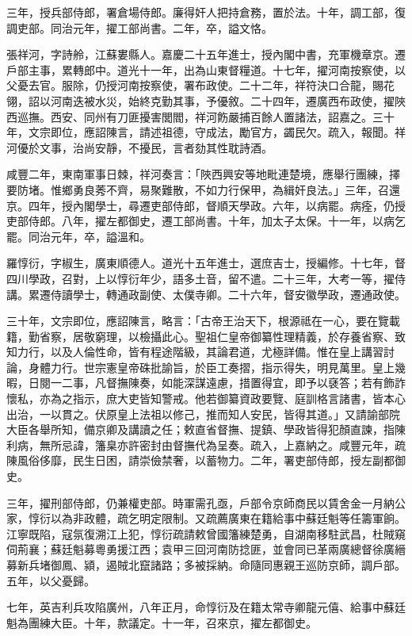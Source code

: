 \begin{pinyinscope}
三年，授兵部侍郎，署倉場侍郎。廉得奸人把持倉務，置於法。十年，調工部，復調吏部。同治元年，擢工部尚書。二年，卒，謚文恪。

張祥河，字詩舲，江蘇婁縣人。嘉慶二十五年進士，授內閣中書，充軍機章京。遷戶部主事，累轉郎中。道光十一年，出為山東督糧道。十七年，擢河南按察使，以父憂去官。服除，仍授河南按察使，署布政使。二十二年，祥符決口合龍，賜花翎，詔以河南迭被水災，始終克勤其事，予優敘。二十四年，遷廣西布政使，擢陜西巡撫。西安、同州有刀匪擾害閭閻，祥河飭嚴捕百餘人置諸法，詔嘉之。三十年，文宗即位，應詔陳言，請述祖德，守成法，勵官方，蠲民欠。疏入，報聞。祥河優於文事，治尚安靜，不擾民，言者劾其性耽詩酒。

咸豐二年，東南軍事日棘，祥河奏言：「陜西興安等地毗連楚境，應舉行團練，擇要防堵。惟鄉勇良莠不齊，易聚難散，不如力行保甲，為緝奸良法。」三年，召還京。四年，授內閣學士，尋遷吏部侍郎，督順天學政。六年，以病罷。病痊，仍授吏部侍郎。八年，擢左都御史，遷工部尚書。十年，加太子太保。十一年，以病乞罷。同治元年，卒，謚溫和。

羅惇衍，字椒生，廣東順德人。道光十五年進士，選庶吉士，授編修。十七年，督四川學政，召對，上以惇衍年少，語多土音，留不遣。二十三年，大考一等，擢侍講。累遷侍讀學士，轉通政副使、太僕寺卿。二十六年，督安徽學政，遷通政使。

三十年，文宗即位，應詔陳言，略言：「古帝王治天下，根源祗在一心，要在覽載籍，勤省察，居敬窮理，以檢攝此心。聖祖仁皇帝御纂性理精義，於存養省察、致知力行，以及人倫性命，皆有程途階級，其論君道，尤極詳備。惟在皇上講習討論，身體力行。世宗憲皇帝硃批諭旨，於臣工奏摺，指示得失，明見萬里。皇上幾暇，日閱一二事，凡督撫陳奏，如能深謀遠慮，措置得宜，即予以褎答；若有飾詐懷私，亦為之指示，庶大吏皆知警戒。他若御纂資政要覽、庭訓格言諸書，皆本心出治，一以貫之。伏原皇上法祖以修己，推而知人安民，皆得其道。」又請諭部院大臣各舉所知，備京卿及講讀之任；敕直省督撫、提鎮、學政皆得犯顏直諫，指陳利病，無所忌諱，籓臬亦許密封由督撫代為呈奏。疏入，上嘉納之。咸豐元年，疏陳風俗侈靡，民生日困，請崇儉禁奢，以蓄物力。二年，署吏部侍郎，授左副都御史。

三年，擢刑部侍郎，仍兼權吏部。時軍需孔亟，戶部令京師商民以賃舍金一月納公家，惇衍以為非政體，疏乞明定限制。又疏薦廣東在籍給事中蘇廷魁等任籌軍餉。江寧既陷，寇氛復溯江上犯，惇衍疏請敕曾國籓練楚勇，自湖南移駐武昌，杜賊窺伺荊襄；蘇廷魁募粵勇援江西；袁甲三回河南防捻匪，並會同已革兩廣總督徐廣縉募新兵堵御鳳、潁，遏賊北竄諸路；多被採納。命隨同惠親王巡防京師，調戶部。五年，以父憂歸。

七年，英吉利兵攻陷廣州，八年正月，命惇衍及在籍太常寺卿龍元僖、給事中蘇廷魁為團練大臣。十年，款議定。十一年，召來京，擢左都御史。


\end{pinyinscope}
